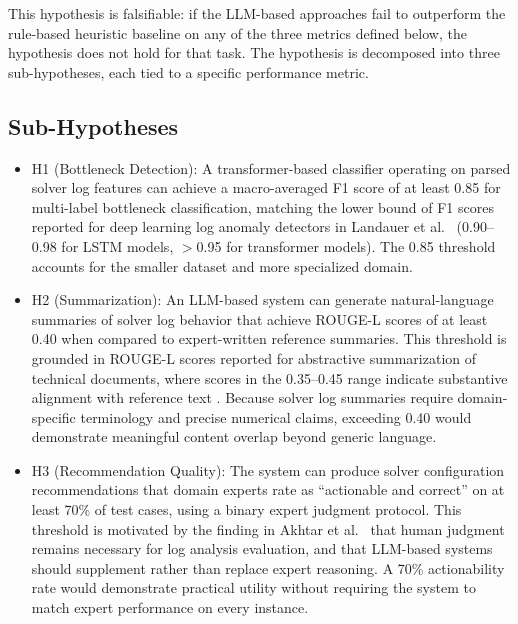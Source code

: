 \documentclass[11pt]{article}
\begin{document}
This hypothesis is falsifiable: if the LLM-based approaches fail to outperform the rule-based heuristic baseline on any of the three metrics defined below, the hypothesis does not hold for that task. The hypothesis is decomposed into three sub-hypotheses, each tied to a specific performance metric.

\subsection{Sub-Hypotheses}

\begin{itemize}
    \item H1 (Bottleneck Detection): A transformer-based classifier operating on parsed solver log features can achieve a macro-averaged F1 score of at least 0.85 for multi-label bottleneck classification, matching the lower bound of F1 scores reported for deep learning log anomaly detectors in Landauer et al.\ \cite{landauer2023deeplearningloganomaly} (0.90--0.98 for LSTM models, $>$0.95 for transformer models). The 0.85 threshold accounts for the smaller dataset and more specialized domain.
    \item H2 (Summarization): An LLM-based system can generate natural-language summaries of solver log behavior that achieve ROUGE-L scores of at least 0.40 when compared to expert-written reference summaries. This threshold is grounded in ROUGE-L scores reported for abstractive summarization of technical documents, where scores in the 0.35--0.45 range indicate substantive alignment with reference text \cite{raffel2020t5}. Because solver log summaries require domain-specific terminology and precise numerical claims, exceeding 0.40 would demonstrate meaningful content overlap beyond generic language.
    \item H3 (Recommendation Quality): The system can produce solver configuration recommendations that domain experts rate as ``actionable and correct'' on at least 70\% of test cases, using a binary expert judgment protocol. This threshold is motivated by the finding in Akhtar et al.\ \cite{akhtar2025llmbasedeventloganalysis} that human judgment remains necessary for log analysis evaluation, and that LLM-based systems should supplement rather than replace expert reasoning. A 70\% actionability rate would demonstrate practical utility without requiring the system to match expert performance on every instance.
\end{itemize}

\end{document}
